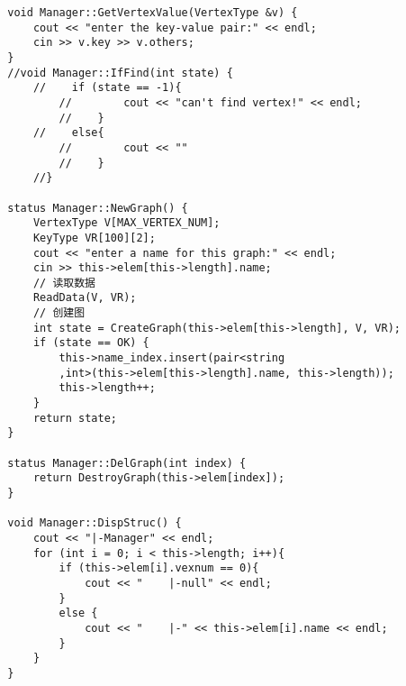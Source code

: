 \documentclass[supercite]{Experimental_Report}
\begin{document}
\begin{lstlisting}
		void Manager::GetVertexValue(VertexType &v) {
			cout << "enter the key-value pair:" << endl;
			cin >> v.key >> v.others;
		}
		//void Manager::IfFind(int state) {
			//    if (state == -1){
				//        cout << "can't find vertex!" << endl;
				//    }
			//    else{
				//        cout << ""
				//    }
			//}
		
		status Manager::NewGraph() {
			VertexType V[MAX_VERTEX_NUM];
			KeyType VR[100][2];
			cout << "enter a name for this graph:" << endl;
			cin >> this->elem[this->length].name;
			// 读取数据
			ReadData(V, VR);
			// 创建图
			int state = CreateGraph(this->elem[this->length], V, VR);
			if (state == OK) {
				this->name_index.insert(pair<string 
				,int>(this->elem[this->length].name, this->length));
				this->length++;
			}
			return state;
		}
		
		status Manager::DelGraph(int index) {
			return DestroyGraph(this->elem[index]);
		}
		
		void Manager::DispStruc() {
			cout << "|-Manager" << endl;
			for (int i = 0; i < this->length; i++){
				if (this->elem[i].vexnum == 0){
					cout << "    |-null" << endl;
				}
				else {
					cout << "    |-" << this->elem[i].name << endl;
				}
			}
		}
	\end{lstlisting}
\end{document}
